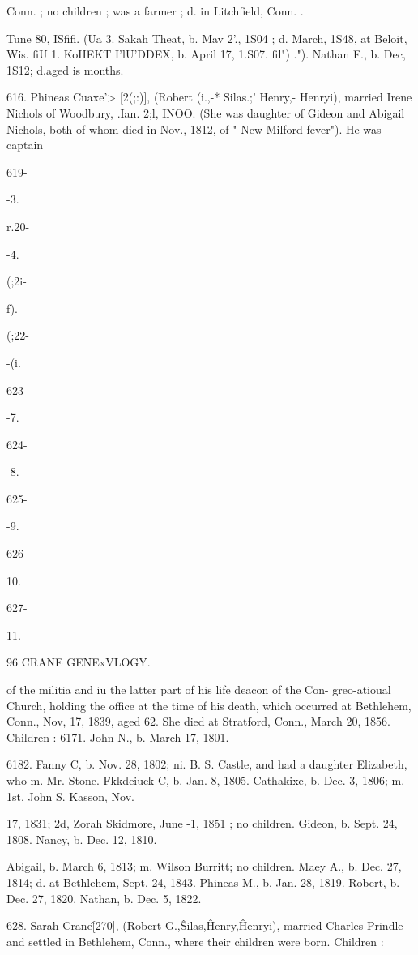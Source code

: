 \documentclass{book}
\begin{document}
Conn. ; no children ; was a farmer ; d. in Litchfield, Conn. . 

Tune 80, ISfifi. 
(Ua 3. Sakah Theat, b. Mav 2'., 1S04 ; d. March, 1S48, at Beloit, Wis. 
fiU 1. KoHEKT I'lU'DDEX, b. April 17, 1.S07. 
fil")  ."). Nathan F., b. Dec, 1S12; d.aged is months. 

616. Phineas Cuaxe'> [2(;:)], (Robert (i.,-* Silas.;' Henry,- 
Henryi), married Irene Nichols of Woodbury, .Ian. 2;l, INOO. 
(She was daughter of Gideon and Abigail Nichols, both of whom 
died in Nov., 1812, of " New Milford fever"). He was captain 



619- 


-3. 


r.20- 


-4. 


(;2i- 


 f). 


(;22- 


-(i. 


623- 


-7. 


624- 


-8. 


625- 


-9. 


626- 


10. 


627- 


11. 



96 CRANE GENExVLOGY. 

of the militia and iu the latter part of his life deacon of the Con- 
greo-atioual Church, holding the office at the time of his death, 
which occurred at Bethlehem, Conn., Nov, 17, 1839, aged 62. 
She died at Stratford, Conn., March 20, 1856. Children : 
6171. John N., b. March 17, 1801. 

6182. Fanny C, b. Nov. 28, 1802; ni. B. S. Castle, and had a 
daughter Elizabeth, who m. Mr. Stone. 
Fkkdeiuck C, b. Jan. 8, 1805. 
Cathakixe, b. Dec. 3, 1806; m. 1st, John S. Kasson, Nov. 

17, 1831; 2d, Zorah Skidmore, June -1, 1851 ; no children. 
Gideon, b. Sept. 24, 1808. 
Nancy, b. Dec. 12, 1810. 

Abigail, b. March 6, 1813; m. Wilson Burritt; no children. 
Maey A., b. Dec. 27, 1814; d. at Bethlehem, Sept. 24, 1843. 
Phineas M., b. Jan. 28, 1819. 
Robert, b. Dec. 27, 1820. 
Nathan, b. Dec. 5, 1822. 

628. Sarah Crane\^ [270], (Robert G.,\^ Silas,\^ Henry,\^ 
Henryi), married Charles Prindle and settled in Bethlehem, 
Conn., where their children were born. Children : 
\end{document}
